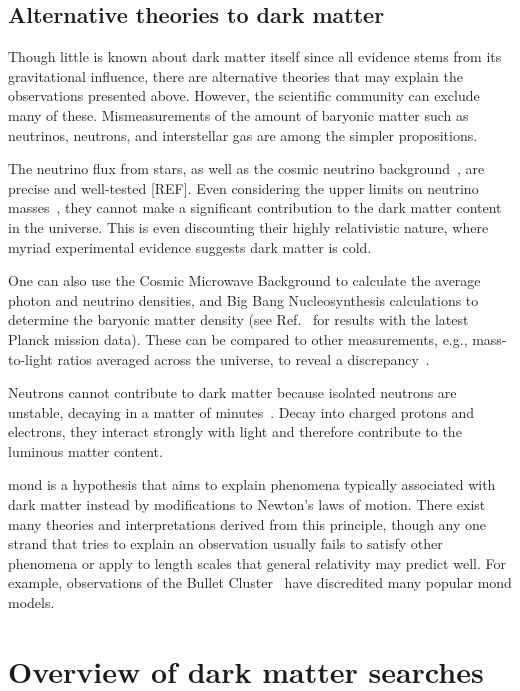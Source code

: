 \subsection{Alternative theories to dark matter}
\label{subsec:intro_alternative_dm_theories}

Though little is known about dark matter itself since all evidence stems from its gravitational influence, there are alternative theories that may explain the observations presented above. However, the scientific community can exclude many of these. Mismeasurements of the amount of baryonic matter such as neutrinos, neutrons, and interstellar gas are among the simpler propositions.

The neutrino flux from stars, as well as the cosmic neutrino background~\cite{weinberg2008cosmology}, are precise and well-tested [REF]. Even considering the upper limits on neutrino masses~\cite{1742-6596-718-2-022013}, they cannot make a significant contribution to the dark matter content in the universe. This is even discounting their highly relativistic nature, where myriad experimental evidence suggests dark matter is cold.

One can also use the Cosmic Microwave Background to calculate the average photon and neutrino densities, and Big Bang Nucleosynthesis calculations to determine the baryonic matter density (see Ref.~ for results with the latest Planck mission data). These can be compared to other measurements, e.g., mass-to-light ratios averaged across the universe, to reveal a discrepancy~\cite{cox2016universal}.

Neutrons cannot contribute to dark matter because isolated neutrons are unstable, decaying in a matter of minutes~\cite{PDGbooklet2010}. Decay into charged protons and electrons, they interact strongly with light and therefore contribute to the luminous matter content.

\Gls{mond} is a hypothesis that aims to explain phenomena typically associated with dark matter instead by modifications to Newton's laws of motion. There exist many theories and interpretations derived from this principle, though any one strand that tries to explain an observation usually fails to satisfy other phenomena or apply to length scales that general relativity may predict well. For example, observations of the Bullet Cluster~\cite{BulletClusterDMevidence} have discredited many popular \acrshort{mond} models.


\section{Overview of dark matter searches}
\label{sec:intro_dm_searches}

